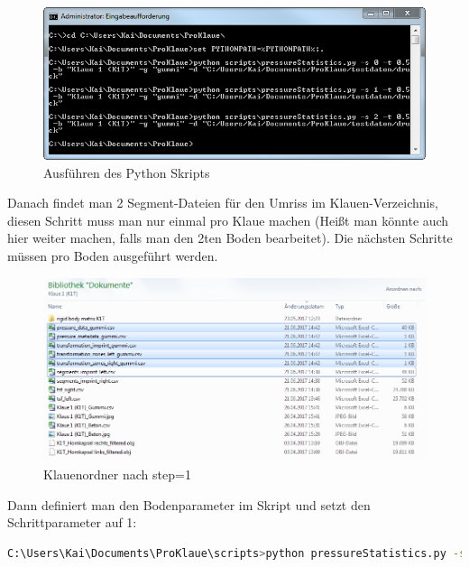 \documentclass[a4paper, openany, oneside]{memoir}
\begin{document}
\begin{figure}
\begin{center}
\includegraphics[height = 0.5\textheight, width=1\textwidth,keepaspectratio]{script.png}
\end{center}
\caption{Ausführen des Python Skripts}
\label{img_pressureStatistics_step0}
\end{figure}

Danach findet man 2 Segment-Dateien für den Umriss im Klauen-Verzeichnis, diesen Schritt muss man nur einmal pro Klaue machen (Heißt man könnte auch hier weiter machen, falls man den 2ten Boden bearbeitet). Die nächsten Schritte müssen pro Boden ausgeführt werden. 

\begin{figure}
\begin{center}
\includegraphics[height = 0.5\textheight, width=1\textwidth,keepaspectratio]{klauenordner_1.png}
\end{center}
\caption{Klauenordner nach step=1}
\label{img_ordner_step1}
\end{figure}

Dann definiert man den Bodenparameter im Skript und setzt den Schrittparameter auf 1:


\begin{minipage}[c]{\textwidth}
\begin{lstlisting}[language=bash]
C:\Users\Kai\Documents\ProKlaue\scripts>python pressureStatistics.py -s 1 -t 0.5 -b "Klaue 1 (K1T)" -g "gummi" -d "C:/Users/Kai/Documents/ProKlaue/testdaten/druck"
\end{lstlisting}
\end{minipage}
\end{document}
